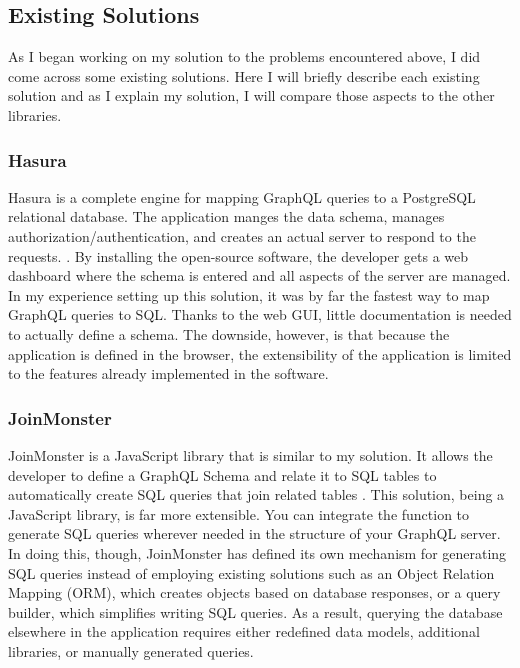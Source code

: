 \subsection{Existing Solutions}

As I began working on my solution to the problems encountered above, I did come across some existing solutions.  Here I will briefly describe each existing solution and as I explain my solution, I will compare those aspects to the other libraries.

\subsubsection{Hasura}

Hasura is a complete engine for mapping GraphQL queries to a PostgreSQL relational database. The application manges the data schema, manages authorization/authentication, and creates an actual server to respond to the requests. \cite{hasurainc.HasuraGraphQLEngine}.  By installing the open-source software, the developer gets a web dashboard where the schema is entered and all aspects of the server are managed.  In my experience setting up this solution, it was by far the fastest way to map GraphQL queries to SQL.  Thanks to the web GUI, little documentation is needed to actually define a schema.  The downside, however, is that because the application is defined in the browser, the extensibility of the application is limited to the features already implemented in the software.

\subsubsection{JoinMonster}

JoinMonster is a JavaScript library that is similar to my solution. It allows the developer to define a GraphQL Schema and relate it to SQL tables to automatically create SQL queries that join related tables \cite{carlJoinMonster}.  This solution, being a JavaScript library, is far more extensible.  You can integrate the function to generate SQL queries wherever needed in the structure of your GraphQL server.  In doing this, though, JoinMonster has defined its own mechanism for generating SQL queries instead of employing existing solutions such as an Object Relation Mapping (ORM), which creates objects based on database responses, or a query builder, which simplifies writing SQL queries.  As a result, querying the database elsewhere in the application requires either redefined data models, additional libraries, or manually generated queries.